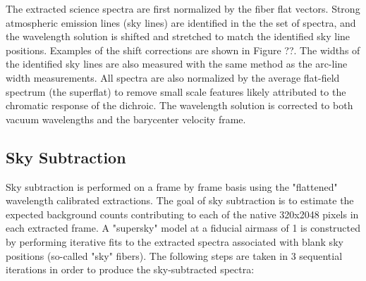 \documentclass[12pt,preprint]{aastex}
\begin{document}
The extracted science spectra are first normalized by the fiber flat vectors.
Strong atmospheric emission lines (sky lines) are identified in the the 
set of spectra, and the wavelength solution is shifted and stretched 
to match the identified sky line positions.  
Examples of the shift corrections are shown in Figure ??.  
The widths of the identified sky lines are also measured with the same method
as the arc-line width measurements.  All spectra are also normalized by
the average flat-field spectrum (the superflat) to remove small scale
features likely attributed to the chromatic response of the dichroic.
The wavelength solution is corrected to both vacuum wavelengths and the
barycenter velocity frame.

\subsection{Sky Subtraction}

Sky subtraction is performed on a frame by frame basis using the 
"flattened" wavelength calibrated extractions.  The goal of sky subtraction
is to estimate the expected background counts contributing to each of 
the native 320x2048 pixels in each extracted frame.  A "supersky" model 
at a fiducial airmass of 1 is constructed by performing iterative fits to
the extracted spectra associated with blank sky positions (so-called
"sky" fibers).   The following steps are taken in 3 sequential iterations
in order to produce the sky-subtracted spectra:
\end{document}
